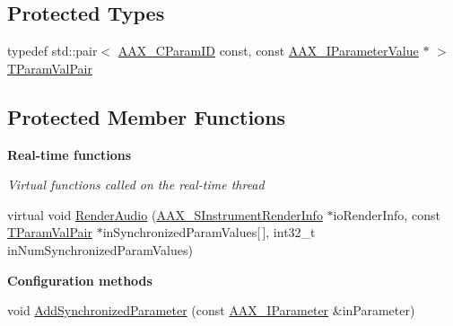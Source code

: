 \subsection*{Protected Types}
\begin{DoxyCompactItemize}
\item 
typedef std\+::pair$<$ \hyperlink{a00149_a1440c756fe5cb158b78193b2fc1780d1}{A\+A\+X\+\_\+\+C\+Param\+I\+D} const, const \hyperlink{a00109}{A\+A\+X\+\_\+\+I\+Parameter\+Value} $\ast$ $>$ \hyperlink{a00026_ac0f3767546709abcf078503bc7dc636b}{T\+Param\+Val\+Pair}
\end{DoxyCompactItemize}
\subsection*{Protected Member Functions}
\begin{Indent}{\bf Real-\/time functions}\par
{\em Virtual functions called on the real-\/time thread }\begin{DoxyCompactItemize}
\item 
virtual void \hyperlink{a00026_a04f2f73d70ea28c17747c68fc3a20fc8}{Render\+Audio} (\hyperlink{a00123}{A\+A\+X\+\_\+\+S\+Instrument\+Render\+Info} $\ast$io\+Render\+Info, const \hyperlink{a00026_ac0f3767546709abcf078503bc7dc636b}{T\+Param\+Val\+Pair} $\ast$in\+Synchronized\+Param\+Values\mbox{[}$\,$\mbox{]}, int32\+\_\+t in\+Num\+Synchronized\+Param\+Values)
\end{DoxyCompactItemize}
\end{Indent}
\begin{Indent}{\bf Configuration methods}\par
\begin{DoxyCompactItemize}
\item 
void \hyperlink{a00026_a1b23573e8aa3f8e64c61813b721559c2}{Add\+Synchronized\+Parameter} (const \hyperlink{a00108}{A\+A\+X\+\_\+\+I\+Parameter} \&in\+Parameter)
\end{DoxyCompactItemize}
\end{Indent}
